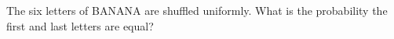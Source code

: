 The six letters of BANANA are shuffled uniformly. What is the probability the first and last letters are equal?
